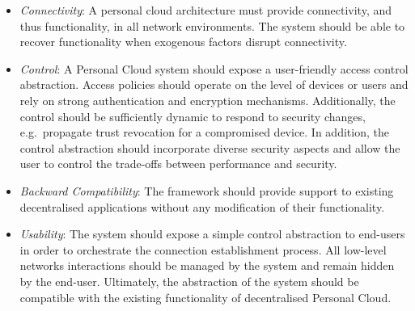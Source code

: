 
\begin{itemize}
  \item {\it Connectivity}\/: A personal cloud architecture must provide
        connectivity, and thus functionality, in all network environments.
        The system should be able to recover functionality when exogenous
        factors disrupt connectivity.     

  \item {\it Control}\/: A Personal Cloud system should expose a user-friendly
        access control abstraction.  Access policies should operate on the level
        of devices or users and rely on strong authentication and encryption
        mechanisms. Additionally, the control should be sufficiently dynamic to
        respond to security changes, e.g.~propagate trust revocation for a
        compromised device. In addition, the control abstraction should
        incorporate diverse security aspects and allow the user to control the
        trade-offs between performance and security.
   
  \item {\it Backward Compatibility}\/: The framework should provide support to
        existing decentralised applications without any modification of their
        functionality.

  \item {\it Usability}\/: The system should expose a simple control abstraction
        to end-users in order to orchestrate the connection establishment
        process. All low-level networks interactions should be managed by the
        system and remain hidden by the end-user. Ultimately, the
        abstraction of the system should be compatible with the existing
        functionality of decentralised Personal Cloud. 
    

 \end{itemize}

